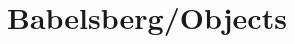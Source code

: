 \documentclass{article}
\newcommand{\stay}[2]{stay({\tt #1}) $=$ {\tt #2}}
\newcommand{\solveH}[3]{{\tt #1;#2} $\models$ {\tt #3}}
\newcommand{\stepH}[9]{{\tt <#1|#2|#3|#4|#5>} $\longrightarrow$
  {\tt <#6|#7|#8|#9>}}
\newcommand{\tcH}[4]{{\tt #1;#2} $\vdash$ {\tt #3} : {\tt #4}}
\newcommand{\tcHC}[3]{{\tt #1;#2} $\vdash$ {\tt #3}}
\newcommand{\inline}[7]{{\tt <#1,#2,#3,\C,\I,#4>} $\leadsto$ {\tt <#5,#6,#7>}}
\newcommand{\C}{$\mathbb{C}$}
\newcommand{\I}{$\mathbb{I}$}
\begin{document}




\section{Babelsberg/Objects}
\label{sec:babelsberg-objects}
\end{document}
